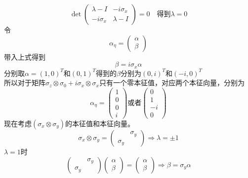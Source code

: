 \documentclass{article}
\numberwithin{equation}{subsection}
\begin{document}
\begin{equation}
    \det\begin{pmatrix}
        \lambda-I&-i\sigma_x\\-i\sigma_x&\lambda-I
    \end{pmatrix}=0\quad\text{得到}\lambda=0
\end{equation}
令
\begin{equation}
    \alpha_\eta=\begin{pmatrix}
        \alpha\\\beta
    \end{pmatrix}
\end{equation}
带入上式得到
\begin{equation}
    \beta=i\sigma_x\alpha
\end{equation}
分别取$\alpha=(1,0)^T$和$(0,1)^T$得到的$\beta$分别为$(0,i)^T$和$(-i,0)^T$\\
所以对于矩阵$\sigma_z\otimes\sigma_0+i\sigma_x\otimes\sigma_x$只有一个零本征值，对应两个本征向量，分别为
\begin{equation}
    \alpha_\eta=\begin{pmatrix}
        1\\0\\0\\i
    \end{pmatrix}\text{或者}\begin{pmatrix}
        0\\1\\-i\\0
    \end{pmatrix}
\end{equation}
现在考虑$(\sigma_x\otimes\sigma_y)$的本征值和本征向量。
\begin{equation}
    \sigma_x\otimes\sigma_y=\begin{pmatrix}
        \quad&\sigma_y\\\sigma_y&\quad
    \end{pmatrix}\Rightarrow\lambda=\pm1
\end{equation}
$\lambda=1$时
\begin{equation}
    \begin{pmatrix}
        \quad&\sigma_y\\\sigma_y&\quad
    \end{pmatrix}\begin{pmatrix}
        \alpha\\\beta
    \end{pmatrix}=\begin{pmatrix}
        \alpha\\\beta
    \end{pmatrix}\Rightarrow\beta=\sigma_y\alpha
\end{equation}
\end{document}
